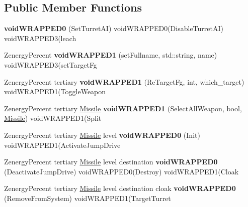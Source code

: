 \subsection*{Public Member Functions}
\begin{DoxyCompactItemize}
\item 
{\bfseries void\+W\+R\+A\+P\+P\+E\+D0} (Set\+Turret\+AI) void\+W\+R\+A\+P\+P\+E\+D0(Disable\+Turret\+AI) void\+W\+R\+A\+P\+P\+E\+D3(leach\hypertarget{classUnitWrapper_a6c5dc5aaf38a74549ef47f00bc2bd6dd}{}\label{classUnitWrapper_a6c5dc5aaf38a74549ef47f00bc2bd6dd}

\item 
Zenergy\+Percent {\bfseries void\+W\+R\+A\+P\+P\+E\+D1} (set\+Fullname, std\+::string, name) void\+W\+R\+A\+P\+P\+E\+D3(set\+Target\+Fg\hypertarget{classUnitWrapper_ae8a9aa9552b052909b67d2b65bac60c5}{}\label{classUnitWrapper_ae8a9aa9552b052909b67d2b65bac60c5}

\item 
Zenergy\+Percent tertiary {\bfseries void\+W\+R\+A\+P\+P\+E\+D1} (Re\+Target\+Fg, int, which\+\_\+target) void\+W\+R\+A\+P\+P\+E\+D1(Toggle\+Weapon\hypertarget{classUnitWrapper_aa44f0d1bef7448211e69ce2bac2fbc62}{}\label{classUnitWrapper_aa44f0d1bef7448211e69ce2bac2fbc62}

\item 
Zenergy\+Percent tertiary \hyperlink{classMissile}{Missile} {\bfseries void\+W\+R\+A\+P\+P\+E\+D1} (Select\+All\+Weapon, bool, \hyperlink{classMissile}{Missile}) void\+W\+R\+A\+P\+P\+E\+D1(Split\hypertarget{classUnitWrapper_a39089ac211eb748cbae2233ff56c4a34}{}\label{classUnitWrapper_a39089ac211eb748cbae2233ff56c4a34}

\item 
Zenergy\+Percent tertiary \hyperlink{classMissile}{Missile} level {\bfseries void\+W\+R\+A\+P\+P\+E\+D0} (Init) void\+W\+R\+A\+P\+P\+E\+D1(Activate\+Jump\+Drive\hypertarget{classUnitWrapper_aa166996bbb8ff95c21433aff6e4c6799}{}\label{classUnitWrapper_aa166996bbb8ff95c21433aff6e4c6799}

\item 
Zenergy\+Percent tertiary \hyperlink{classMissile}{Missile} level destination {\bfseries void\+W\+R\+A\+P\+P\+E\+D0} (Deactivate\+Jump\+Drive) void\+W\+R\+A\+P\+P\+E\+D0(Destroy) void\+W\+R\+A\+P\+P\+E\+D1(Cloak\hypertarget{classUnitWrapper_a365f63247ad780f1e2f9f04b68bd3513}{}\label{classUnitWrapper_a365f63247ad780f1e2f9f04b68bd3513}

\item 
Zenergy\+Percent tertiary \hyperlink{classMissile}{Missile} level destination cloak {\bfseries void\+W\+R\+A\+P\+P\+E\+D0} (Remove\+From\+System) void\+W\+R\+A\+P\+P\+E\+D1(Target\+Turret\hypertarget{classUnitWrapper_a744b00ad6acbd604903934f09c7b278f}{}\label{classUnitWrapper_a744b00ad6acbd604903934f09c7b278f}


\end{DoxyCompactItemize}
